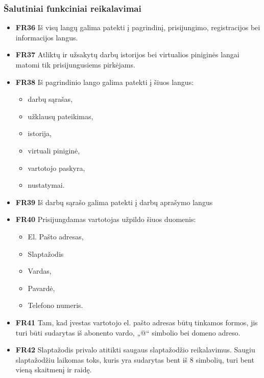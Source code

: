 \documentclass{VUMIFPSbakalaurinis}
\begin{document}
\subsubsection{Šalutiniai funkciniai reikalavimai}
\begin{itemize}
	\item \textbf{FR36} Iš visų langų galima patekti į pagrindinį, prisijungimo, registracijos bei informacijos langus.
	\item \textbf{FR37} Atliktų ir užsakytų darbų istorijos bei virtualios piniginės langai matomi tik prisijungusiems pirkėjams.
	\item \textbf{FR38} Iš pagrindinio lango galima patekti į šiuos langus:
	\begin{itemize}
		\item darbų sąrašas,
		\item užklausų pateikimas,
		\item istorija,
		\item virtuali piniginė,
		\item vartotojo paskyra,
		\item nustatymai.
	\end{itemize}
	\item \textbf{FR39} Iš darbų sąrašo galima patekti  į darbų aprašymo langus
\end{itemize}

\begin{itemize}
	\item \textbf{FR40} Prisijungdamas vartotojas užpildo šiuos duomenis:
	\begin{itemize}
		\item El. Pašto adresas,
		\item Slaptažodis
		\item Vardas,
		\item Pavardė,
		\item Telefono numeris.
	\end{itemize}
	\item \textbf{FR41} Tam, kad įvestas vartotojo el. pašto adresas būtų tinkamos formos, jis turi būti sudarytas iš abonento vardo, „@“ simbolio bei domeno adreso.
	\item \textbf{FR42} Slaptažodis privalo atitikti saugaus slaptažodžio reikalavimus. Saugiu slaptažodžiu laikomas toks, kuris yra sudarytas bent iš 8 simbolių, turi bent vieną skaitmenį ir raidę.
\end{itemize}
\end{document}
